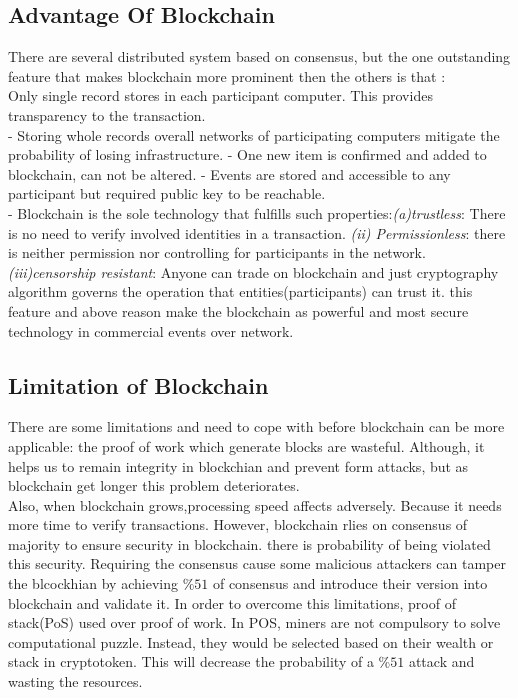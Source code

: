 \subsection{Advantage Of Blockchain}
There are several distributed system based on consensus, but the one outstanding feature that makes blockchain  more prominent then the others is that :\\
Only single record stores in each participant computer. This provides transparency to the transaction.\\ 
- Storing whole records overall networks of participating computers mitigate the probability of losing infrastructure.
- One new item is confirmed and added to blockchain, can not be altered.
- Events are stored and accessible to any participant but required public key to be reachable\cite{Sharples}.\\
- Blockchain is the sole technology that fulfills such properties:\textit{(a)trustless}: There is no need to verify involved identities in a transaction. \textit{(ii) Permissionless}: there is neither permission nor controlling for participants in the network.   \textit{(iii)censorship resistant}: Anyone can trade on blockchain and just cryptography algorithm governs the operation that entities(participants) can trust it.
this feature and above reason make the blockchain as powerful and most secure technology in commercial events over network\cite{Panarello}.


\subsection{Limitation of Blockchain}
There are some limitations and need to cope with before blockchain can be more applicable: the proof of work which generate blocks are wasteful. Although, it helps us to remain integrity in blockchian and prevent form attacks, but as blockchain get longer this problem deteriorates.\\
Also, when blockchain grows,processing speed affects adversely. Because it needs more time to verify transactions. However, blockchain rlies on consensus of majority to ensure security in blockchain. there is probability of being violated this security. Requiring the consensus cause some malicious attackers can tamper the blcockhian by achieving $\%51$ of consensus and introduce their version into blockchain and validate it.
In order to overcome this limitations, proof of stack(PoS) used over proof of work. In POS, miners are not compulsory to solve computational puzzle. Instead, they would be selected based on their wealth or stack in cryptotoken. This will decrease the probability of a $\%51$ attack and wasting the resources.

